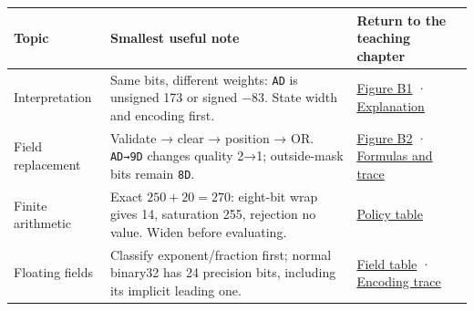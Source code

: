 {\def\LTcaptype{none} %
\begin{longtable}[]{@{}
  >{\raggedright\arraybackslash}p{}
  >{\raggedright\arraybackslash}p{}
  >{\raggedright\arraybackslash}p{}@{}}
\toprule\noalign{}
\begin{minipage}[b]{\linewidth}\raggedright
Topic
\end{minipage} & \begin{minipage}[b]{\linewidth}\raggedright
Smallest useful note
\end{minipage} & \begin{minipage}[b]{\linewidth}\raggedright
Return to the teaching chapter
\end{minipage} \\
\midrule\noalign{}
\endhead
\bottomrule\noalign{}
\endlastfoot
Interpretation & Same bits, different weights: \texttt{AD} is unsigned 173 or signed −83. State width and encoding first. & \href{Continuous\%20Notes/Computing\%20Foundations\%20-\%20From\%20Bits\%20to\%20C++\%20and\%20Systems\%20APIs\#Figure\%20B1\%20-\%20One\%20pattern,\%20two\%20integer\%20readings/}{Figure B1} · \href{Continuous\%20Notes/Computing\%20Foundations\%20-\%20From\%20Bits\%20to\%20C++\%20and\%20Systems\%20APIs\#The\%20same\%20bits\%20can\%20mean\%20different\%20integers/}{Explanation} \\
Field replacement & Validate → clear → position → OR. \texttt{AD→9D} changes quality 2→1; outside-mask bits remain \texttt{8D}. & \href{Continuous\%20Notes/Computing\%20Foundations\%20-\%20From\%20Bits\%20to\%20C++\%20and\%20Systems\%20APIs\#Figure\%20B2\%20-\%20Replace\%20a\%20field\%20without\%20damaging\%20its\%20neighbors/}{Figure B2} · \href{Continuous\%20Notes/Computing\%20Foundations\%20-\%20From\%20Bits\%20to\%20C++\%20and\%20Systems\%20APIs\#Fields:\%20select,\%20normalize,\%20replace/}{Formulas and trace} \\
Finite arithmetic & Exact \(250+20=270\): eight-bit wrap gives 14, saturation 255, rejection no value. Widen before evaluating. & \href{Continuous\%20Notes/Computing\%20Foundations\%20-\%20From\%20Bits\%20to\%20C++\%20and\%20Systems\%20APIs\#Choose\%20the\%20overflow\%20policy\%20before\%20calculating/}{Policy table} \\
Floating fields & Classify exponent/fraction first; normal binary32 has 24 precision bits, including its implicit leading one. & \href{Continuous\%20Notes/Computing\%20Foundations\%20-\%20From\%20Bits\%20to\%20C++\%20and\%20Systems\%20APIs\#The\%20two\%20formats\%20and\%20their\%20interpretation/}{Field table} · \href{Continuous\%20Notes/Computing\%20Foundations\%20-\%20From\%20Bits\%20to\%20C++\%20and\%20Systems\%20APIs\#Encode\%2010.625,\%20then\%20decode\%20−13.25/}{Encoding trace} \\

\end{longtable}}
